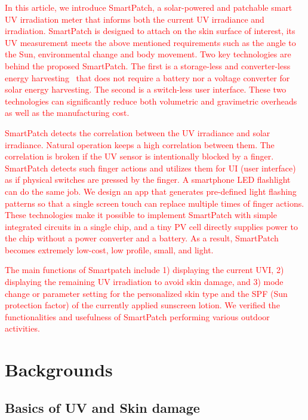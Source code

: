 \documentclass[journal]{IEEEtran}
\begin{document}
\textcolor{red}{In this article, we introduce SmartPatch, a solar-powered and patchable smart UV irradiation meter that informs both the current UV irradiance and irradiation. SmartPatch is designed to attach on the skin surface of interest, its UV measurement meets the above mentioned requirements such as the angle to the Sun, environmental change and body movement. Two key technologies are behind the proposed SmartPatch. The first is a storage-less and converter-less energy harvesting~\cite{Lee:ASPDAC15} that does not require a battery nor a voltage converter for solar energy harvesting. The second is a switch-less user interface. These two technologies can significantly reduce both volumetric and gravimetric overheads as well as the manufacturing cost.}

\textcolor{red}{SmartPatch detects the correlation between the UV irradiance and solar irradiance. Natural operation keeps a high correlation between them. The correlation is broken if the UV sensor is intentionally blocked by a finger. SmartPatch detects such finger actions and utilizes them for UI (user interface) as if physical switches are pressed by the finger. A smartphone LED flashlight can do the same job. We design an app that  generates pre-defined light flashing patterns so that a single screen touch can replace multiple times of finger actions. These technologies make it possible to implement SmartPatch with simple integrated circuits in a single chip, and a tiny PV cell directly supplies power to the chip without a power converter and a battery. As a result, SmartPatch becomes extremely low-cost, low profile, small, and light.}

 \textcolor{red}{The main functions of Smartpatch include 1) displaying the current UVI, 2) displaying the remaining UV irradiation to avoid skin damage, and 3) mode change or parameter setting for the personalized skin type and the SPF (Sun protection factor) of the currently applied sunscreen lotion. We verified the functionalities and usefulness of SmartPatch performing various outdoor activities.}

\section{Backgrounds}
\subsection{Basics of UV and Skin damage}
\end{document}
